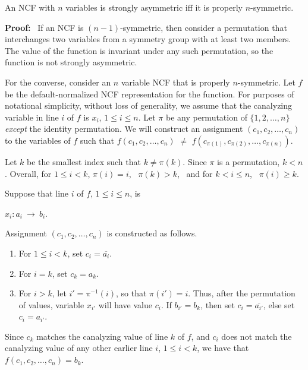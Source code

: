 \begin{theorem}\label{thm:ncf_strong_asymmetry}
An NCF with $n$ variables is strongly asymmetric iff
it is properly $n$-symmetric.
\end{theorem}

\noindent
\textbf{Proof:}~ 
If an NCF is $(n-1)$-symmetric, then consider a permutation that
interchanges two variables from a symmetry group with at least two
members.  The value of the function is invariant under any such
permutation, so the function is not strongly asymmetric.

For the converse, consider an $n$ variable NCF that is properly $n$-symmetric.
Let $f$ be the default-normalized NCF representation for the function.  For
purposes of notational simplicity, without loss of generality,
we assume that the canalyzing
variable in line $i$ of $f$ is $x_i$, $1 \leq i \leq n$.  Let $\pi$
be any permutation of $\{1, 2, \ldots, n\}$ \emph{except} the
identity permutation.  We will construct an assignment $(c_1, c_2,
\ldots,  c_n)$ to the variables of $f$ such that $f(c_1, c_2, \ldots,
c_n)$ $\neq$ $f(c_{\pi(1)}, c_{\pi(2)}, \ldots, c_{\pi(n)})$.

Let $k$ be the smallest index such that $k \neq \pi(k)$.  Since
$\pi$ is a permutation, $k < n$.  Overall, for $1 \leq i < k$,
$\pi(i) = i$,~ $\pi(k) > k$,~ and for $k < i \leq n$,~ $\pi(i) \geq k$.

\smallskip

Suppose that line $i$ of $f$, $1 \leq i \leq n$, is 

\smallskip

\hspace*{0.25in} $x_i : a_i ~\longrightarrow~ b_i$. 

\smallskip

\noindent
Assignment $(c_1, c_2, \ldots,  c_n)$ is constructed as follows.
\begin{enumerate}
\item For $1 \leq i < k$, set $c_i = \overline{a_i}$.  
\item For $i = k$, set $c_k =a_k$. 
\item For $i > k$, let $i' = \pi^{-1}(i)$, so that $\pi(i')
= i$.  Thus, after the permutation of values, variable $x_{i'}$
will have value $c_i$.  If $b_{i'} = b_k$, then set $c_i =
\overline{a_{i'}}$, else set $c_i =  a_{i'}$.
\end{enumerate}
Since $c_k$ matches the canalyzing value of line $k$ of $f$, and
$c_i$ does not match the canalyzing value of any other earlier line
$i$, $1 \leq i < k$, we have that $f(c_1, c_2, \ldots,  c_n) = b_k$.

